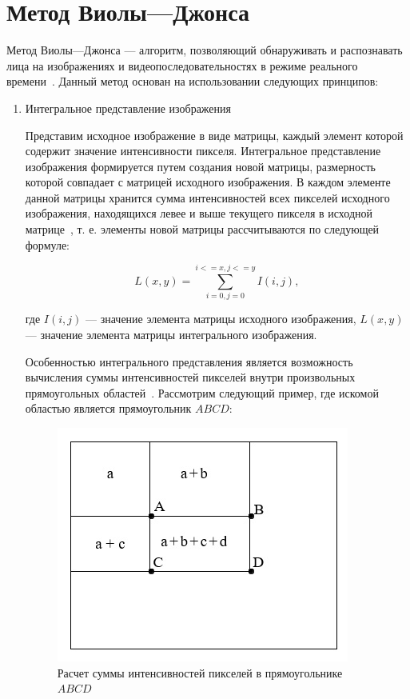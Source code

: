 \chapter{Метод Виолы---Джонса}

Метод Виолы---Джонса --- алгоритм, позволяющий обнаруживать и распознавать лица на изображениях и видеопоследовательностях в режиме реального времени~\cite{viola}. Данный метод основан на использовании следующих принципов:
\begin{enumerate}[label=\arabic*.]
    \item Интегральное представление изображения

    Представим исходное изображение в виде матрицы, каждый элемент которой содержит значение интенсивности пикселя. Интегральное представление изображения формируется путем создания новой матрицы, размерность которой совпадает с матрицей исходного изображения. В каждом элементе данной матрицы хранится сумма интенсивностей всех пикселей исходного изображения, находящихся левее и выше текущего пикселя в исходной матрице~\cite{tomsk}, т. е. элементы новой матрицы рассчитываются по следующей формуле:
    
    \begin{equation}
        L(x,y) = \sum_{i=0, j=0}^{i<=x, j<=y} I(i,j),
    \end{equation}

    где $I(i, j)$ --- значение элемента матрицы исходного изображения, $L(x,y)$ --- значение элемента матрицы интегрального изображения.

    Особенностью интегрального представления является возможность вычисления суммы интенсивностей пикселей внутри произвольных прямоугольных областей~\cite{tomsk}. Рассмотрим следующий пример, где искомой областью является прямоугольник $ABCD$:

    \begin{figure}[h]
	\centering
	\includegraphics[height=0.25\textheight]{img/integral.jpg}
	\caption{Расчет суммы интенсивностей пикселей в прямоугольнике $ABCD$}
    \label{img:integral}
    \end{figure}


\end{enumerate}
